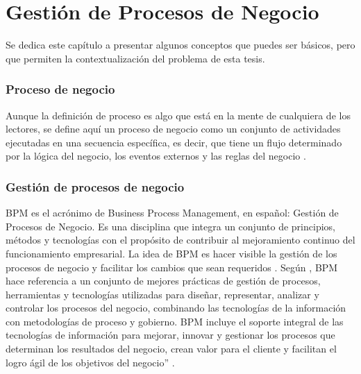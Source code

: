 \chapter{Gestión de Procesos de Negocio}
Se dedica este capítulo a presentar algunos conceptos que puedes ser básicos, pero que permiten la contextualización del problema de esta tesis.


\subsection{Proceso de negocio}

Aunque la definición de proceso es algo que está en la mente de cualquiera de los lectores, se define aquí un proceso de negocio como un conjunto de actividades ejecutadas en una secuencia específica, es decir, que tiene un flujo determinado por la lógica del negocio, los eventos externos y las reglas del negocio \citep{hitpass2017bpm}.

\subsection{Gestión de procesos de negocio}

BPM es el acrónimo de Business Process Management, en español: Gestión de Procesos de Negocio. Es una disciplina que integra un conjunto de principios, métodos y tecnologías con el propósito de contribuir al mejoramiento continuo del funcionamiento empresarial. La idea de BPM es hacer visible la gestión de los procesos de negocio y facilitar los cambios que sean requeridos \citep{smith2003business}. Según \citet{garimella2008introduccion}, BPM hace referencia a un conjunto de mejores prácticas de gestión de procesos, herramientas y tecnologías utilizadas para diseñar, representar, analizar y controlar los procesos del negocio, combinando las tecnologías de la información con metodologías de proceso y gobierno. BPM incluye el soporte integral de las tecnologías de información para mejorar, innovar y gestionar los procesos que determinan los resultados del negocio, crean valor para el cliente y facilitan el logro ágil de los objetivos del negocio” \citep{abpmp2013v3}.

